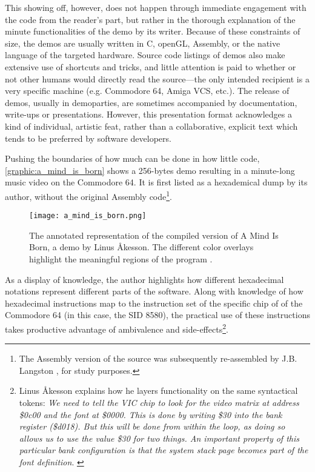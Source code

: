 This showing off, however, does not happen through immediate engagement with the code from the reader's part, but rather in the thorough explanation of the minute functionalities of the demo by its writer. Because of these constraints of size, the demos are usually written in C, openGL, Assembly, or the native language of the targeted hardware. Source code listings of demos also make extensive use of shortcuts and tricks, and little attention is paid to whether or not other humans would directly read the source—the only intended recipient is a very specific machine (e.g. Commodore 64, Amiga VCS, etc.). The release of demos, usually in demoparties, are sometimes accompanied by documentation, write-ups or presentations. However, this presentation format acknowledges a kind of individual, artistic feat, rather than a collaborative, explicit text which tends to be preferred by software developers.

Pushing the boundaries of how much can be done in how little code, \autoref{graphic:a_mind_is_born} shows a 256-bytes demo resulting in a minute-long music video \citep{akesson_mind_2017} on the Commodore 64. It is first listed as a hexademical dump by its author, without the original Assembly code\footnote{The Assembly version of the source was subsequently re-assembled by J.B. Langston \citep{langston_mind_2017}, for study purposes.}.

\begin{figure}
  \texttt{[image: a\_mind\_is\_born.png]}
  \caption{The annotated representation of the compiled version of A Mind Is Born, a demo by Linus Åkesson. The different color overlays highlight the meaningful regions of the program \citep{akesson_mind_2017}.}
  \label{graphic:a_mind_is_born}
\end{figure}

As a display of knowledge, the author highlights how different hexadecimal notations represent different parts of the software. Along with knowledge of how hexadecimal instructions map to the instruction set of the specific chip of of the Commodore 64 (in this case, the SID 8580), the practical use of these instructions takes productive advantage of ambivalence and side-effects\footnote{Linus Åkesson explains how he layers functionality on the same syntactical tokens: \emph{We need to tell the VIC chip to look for the video matrix at address \$0c00 and the font at \$0000. This is done by writing \$30 into the bank register (\$d018). But this will be done from within the loop, as doing so allows us to use the value \$30 for two things. An important property of this particular bank configuration is that the system stack page becomes part of the font definition}. \citep{akesson_mind_2017}}.

